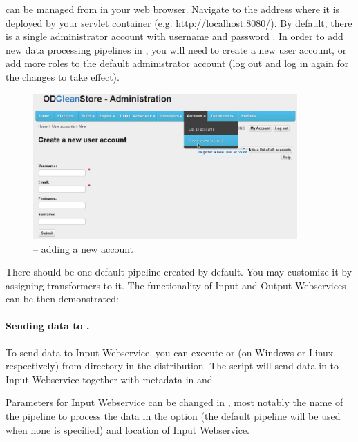 \odcs can be managed from \FE in your web browser. Navigate to the address where it is deployed by your servlet container (e.g. http://localhost:8080/). By default, there is a single administrator account with username  and password . In order to add new data processing pipelines in \FE, you will need to create a new user account, or add more roles to the default administrator account (log out and log in again for the changes to take effect).

\begin{figure}[htb]
    \centering
    \includegraphics[width=0.9\textwidth]{images/fe-new-account.png}
    \caption{\FE -- adding a new account}
\end{figure}

There should be one default pipeline created by default. You may customize it by assigning transformers to it.
The functionality of Input and Output Webservices can be then demonstrated:

\paragraph{Sending data to \odcs.}
    To send data to Input Webservice, you can execute  or  (on Windows or Linux, respectively) from 
   directory  in the distribution. The script will send data in 
   to Input Webservice together with metadata in 
   and 
   
   Parameters for Input Webservice can be changed in 
   , most notably the name of the pipeline to 
   process the data in the  option (the default pipeline will be used when none is specified) and location of Input Webservice.
      
